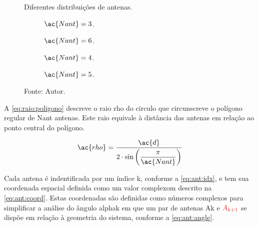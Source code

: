 \begin{figure}[htbp]
    \centering
    \caption{Diferentes distribuições de antenas.}
    \label{fig:antennas}

    \hfill
    \begin{subfigure}[c]{0.4\textwidth}
        \centering
        \caption{$ \ac{Nant} = 3 $.}
        
        \label{fig:antennas:3}
    \end{subfigure}
    \hfill
    \begin{subfigure}[c]{0.575\textwidth}
        \centering
        \caption{$ \ac{Nant} = 6 $.}
        
        \label{fig:antennas:6}
    \end{subfigure}
    \hfill

    \vspace{\floatsep}

    \hfill
    \begin{subfigure}[c]{0.45\textwidth}
        \centering
        \caption{$ \ac{Nant} = 4 $.}
        
        \label{fig:antennas:4}
    \end{subfigure}
    \hfill
    \begin{subfigure}[c]{0.5\textwidth}
        \centering
        \caption{$ \ac{Nant} = 5 $.}
        
        \label{fig:antennas:5}
    \end{subfigure}
    \hfill

    \caption*{Fonte: Autor.}
\end{figure}

A \autoref{eq:raio:poligono} descreve o raio \ac{rho} do circulo que circunscreve o polígono regular de \ac{Nant} antenas.
Este raio equivale à distância das antenas em relação ao ponto central do polígono.

\begin{equation} \label{eq:raio:poligono} %
	\ac{rho} = \frac{\ac{d}}{2\cdot \sin\left(\displaystyle\frac{\pi}{\ac{Nant}}\right)}
\end{equation}

Cada antena é indentificada por um índice \ac{k}, conforme a \autoref{eq:ant:idx}, e tem sua coordenada espacial definida como um valor complexom descrito na \autoref{eq:ant:coord}.
Estas coordenadas são definidas como números complexos para simplificar a análise do ângulo \textcolor{cmyk_M}{\ac{alphak}} em que um par de antenas \textcolor{cmyk_B}{\ac{Ak}} e $\textcolor{cmyk_R}{A_{k+1}}$ se dispõe em relação à geometria do sistema, conforme a \autoref{eq:ant:angle}.

